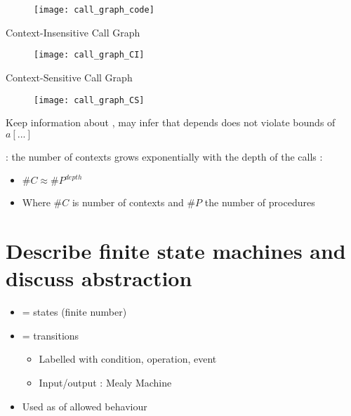 \begin{figure}[H]
    \centering
    \texttt{[image: call\_graph\_code]}
\end{figure}

\begin{minipage}[t]{0.48\textwidth}
    Context-Insensitive Call Graph
    \begin{figure}[H]
        \centering
        \texttt{[image: call\_graph\_CI]}
    \end{figure}
\end{minipage}
\hfill
\begin{minipage}[t]{0.48\textwidth}
    Context-Sensitive Call Graph
    \begin{figure}[H]
        \centering
        \texttt{[image: call\_graph\_CS]}
    \end{figure}
    Keep information about , may infer that depends does not violate bounds of $a[...]$
\end{minipage}

:  the number of contexts grows exponentially with the depth of the calls :
\begin{itemize}
    \item $\#C \approx \#P^{depth}$
    \item Where $\#C$ is number of contexts and $\#P$ the number of procedures
\end{itemize}

\newpage
\section{Describe finite state machines and discuss abstraction}

\begin{itemize}
    \item  {} = states (finite number)
    \item  {} = transitions
    \begin{itemize}
        \item Labelled with condition, operation, event
        \item Input/output : Mealy Machine
    \end{itemize}
    \item Used as  of allowed behaviour
\end{itemize}

